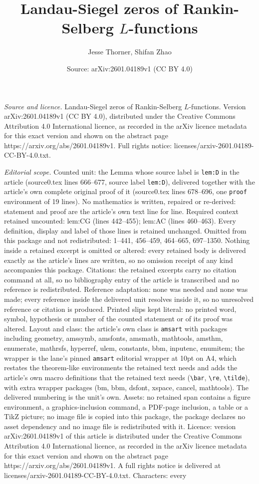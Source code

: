 \documentclass[10pt,a4paper]{amsart}
\title[Landau-Siegel zeros of Rankin-Selberg $L$-functions]{Landau-Siegel zeros of Rankin-Selberg $L$-functions}
\author{Jesse Thorner, Shifan Zhao}
\date{Source: arXiv:2601.04189v1 (CC BY 4.0)}
\begin{document}
\maketitle

\noindent\emph{Source and licence.} Landau-Siegel zeros of Rankin-Selberg $L$-functions. Version arXiv:2601.04189v1 (CC BY 4.0), distributed under the Creative Commons Attribution 4.0 International licence, as recorded in the arXiv licence metadata for this exact version and shown on the abstract page https://arxiv.org/abs/2601.04189v1. Full rights notice: licenses/arxiv-2601.04189-CC-BY-4.0.txt.\par\smallskip

\noindent\textit{Editorial scope.} Counted unit: the Lemma whose source label is \texttt{lem:D} in the article (source0.tex lines 666--677, source label \texttt{lem:D}), delivered together with the article's own complete original proof of it (source0.tex lines 678--696, one \texttt{proof} environment of 19 lines). No mathematics is written, repaired or re-derived: statement and proof are the article's own text line for line. Required context retained uncounted: lem:CG (lines 442--455); lem:AC (lines 460--463). Every definition, display and label of those lines is retained unchanged. Omitted from this package and not redistributed: 1--441, 456--459, 464--665, 697--1350. Nothing inside a retained excerpt is omitted or altered: every retained body is delivered exactly as the article's lines are written, so no omission receipt of any kind accompanies this package. Citations: the retained excerpts carry no citation command at all, so no bibliography entry of the article is transcribed and no reference is redistributed. Reference adaptation: none was needed and none was made; every reference inside the delivered unit resolves inside it, so no unresolved reference or citation is produced. Printed slips kept literal: no printed word, symbol, hypothesis or number of the counted statement or of its proof was altered. Layout and class: the article's own class is \texttt{amsart} with packages including geometry, amssymb, amsfonts, amsmath, mathtools, amsthm, enumerate, mathrsfs, hyperref, ulem, constants, bbm, inputenc, enumitem; the wrapper is the lane's pinned \texttt{amsart} editorial wrapper at 10pt on A4, which restates the theorem-like environments the retained text needs and adds the article's own macro definitions that the retained text needs (\texttt{\textbackslash bar}, \texttt{\textbackslash re}, \texttt{\textbackslash tilde}), with extra wrapper packages (bm, bbm, dsfont, xspace, cancel, mathtools). The delivered numbering is the unit's own. Assets: no retained span contains a figure environment, a graphics-inclusion command, a PDF-page inclusion, a table or a TikZ picture; no image file is copied into this package, the package declares no asset dependency and no image file is redistributed with it. Licence: version arXiv:2601.04189v1 of this article is distributed under the Creative Commons Attribution 4.0 International licence, as recorded in the arXiv licence metadata for this exact version and shown on the abstract page https://arxiv.org/abs/2601.04189v1. A full rights notice is delivered at licenses/arxiv-2601.04189-CC-BY-4.0.txt. Characters: every 
\end{document}
